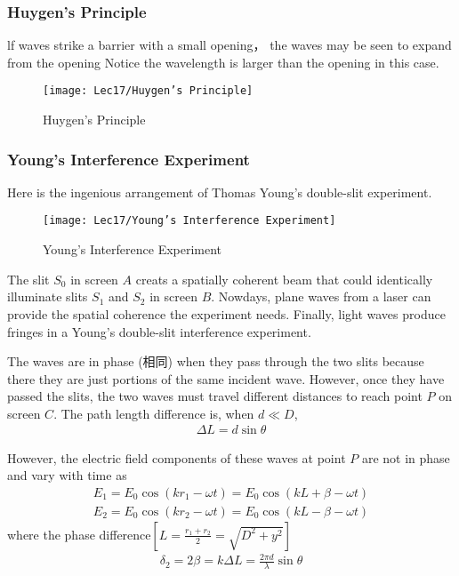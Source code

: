 \subsubsection{Huygen's Principle}
lf waves strike a barrier with a small opening， the waves may be seen to expand from the opening Notice the wavelength is larger than the opening in this case. 

\begin{figure}[H]
    \centering
    \texttt{[image: Lec17/Huygen's Principle]}
    \caption{Huygen's Principle}
\end{figure}

\subsubsection{Young's Interference Experiment}
Here is the ingenious arrangement of Thomas Young's double-slit experiment. 

\begin{figure}[H]
    \centering
    \texttt{[image: Lec17/Young's Interference Experiment]}
    \caption{Young's Interference Experiment}
\end{figure}

The slit $S_0$ in screen $A$ creats a spatially coherent beam that could identically illuminate slits $S_1$  and $S_2$ in screen $B$. Nowdays, plane waves from a laser can provide the spatial coherence the experiment needs. Finally, light waves produce fringes in a Young’s double-slit interference experiment. 

The waves are in phase (相同) when they pass through the two slits because there they are just portions of the same incident wave. However, once they have passed the slits, the two waves must travel different distances to reach point $P$ on screen $C$. The path length difference is, when $d\ll D$,
\begin{align*}
    \Delta L=d\sin\theta
\end{align*}

However, the electric field components of these waves at point $P$ are not in phase and vary with time as
\begin{align*}
    E_1=E_0\cos(kr_1-\omega t)=E_0\cos(kL+\beta -\omega t)\\
    E_2=E_0\cos(kr_2-\omega t)=E_0\cos(kL-\beta -\omega t)
\end{align*}
where the phase difference$\left[ L=\frac{r_1+r_2}{2}=\sqrt{D^2+y^2} \right]$
\begin{align*}
    \delta_2=2\beta=k\Delta L=\frac{2\pi d}{\lambda}\sin\theta
\end{align*}

